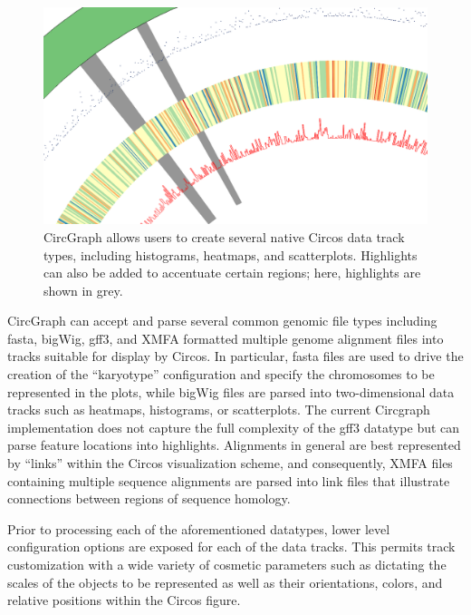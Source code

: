 \documentclass[twocolumn]{article}
\newcommand{\projectName}{CircGraph\xspace}
\begin{document}
\begin{figure}
\centering
\includegraphics[scale=0.15]{./results/hilite-detail.png}
\caption{\projectName allows users to create several native Circos data track types, including histograms, heatmaps, and scatterplots. Highlights can also be added to accentuate certain regions; here, highlights are shown in grey.\label{fig:hilite}}
\end{figure}


\projectName can accept and parse several common genomic file types including fasta, bigWig, gff3, and XMFA formatted multiple genome alignment files into tracks suitable for display by Circos. In particular, fasta files are used to drive the creation of the ``karyotype'' configuration and specify the chromosomes to be represented in the plots, while bigWig files are parsed into two-dimensional data tracks such as heatmaps, histograms, or scatterplots. The current Circgraph implementation does not capture the full complexity of the gff3 datatype but can parse feature locations into highlights. Alignments in general are best represented by ``links'' within the Circos visualization scheme, and consequently, XMFA files containing multiple sequence alignments are parsed into link files that illustrate connections between regions of sequence homology.

Prior to processing each of the aforementioned datatypes, lower level configuration options are exposed for each of the data tracks. This permits track customization with a wide variety of cosmetic parameters such as dictating the scales of the objects to be represented as well as their orientations, colors, and relative positions within the Circos figure.
\end{document}
